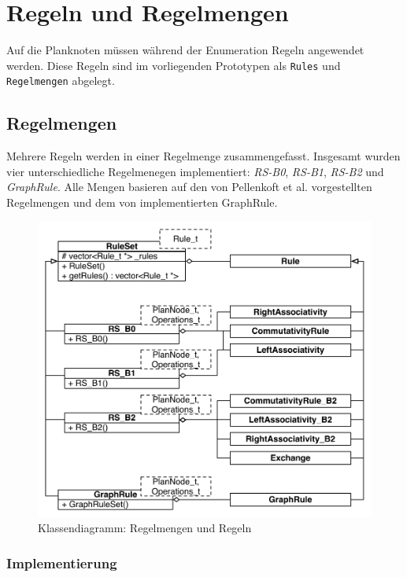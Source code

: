 \section{Regeln und Regelmengen}
Auf die Planknoten müssen während der Enumeration Regeln angewendet werden. Diese Regeln sind im vorliegenden Prototypen als \texttt{Rules} und \texttt{Regelmengen} abgelegt.

\subsection{Regelmengen}
Mehrere Regeln werden in einer Regelmenge zusammengefasst.
Insgesamt wurden vier unterschiedliche Regelmenegen implementiert: \textit{RS-B0}, \textit{RS-B1}, \textit{RS-B2} und \textit{GraphRule}.
Alle Mengen basieren auf den von Pellenkoft et al. vorgestellten Regelmengen und dem von \cite{shanbhag2014optimizing} implementierten GraphRule.

\begin{figure}[ht]
  \centering
  \includegraphics[width=\textwidth]{04_Implementierung/00_media/RuleSets.pdf}
  \caption{Klassendiagramm: Regelmengen und Regeln}
  \label{RuleSetClass}
\end{figure}

\subsubsection{Implementierung}
\label{sec:RuleImplementation}

